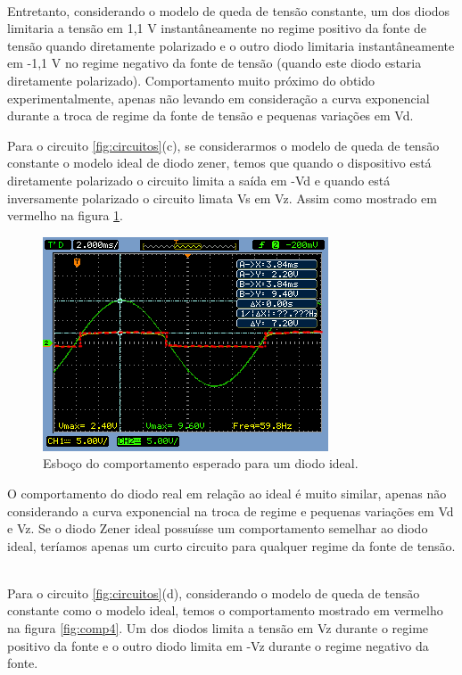 \documentclass{abntex2}
\begin{document}
\\Entretanto, considerando o modelo de queda de tensão constante, um dos diodos limitaria a tensão em 1,1 V instantâneamente no regime positivo da fonte de tensão quando diretamente polarizado e o outro diodo limitaria instantâneamente em -1,1 V no regime negativo da
fonte de tensão (quando este diodo estaria diretamente polarizado). Comportamento muito próximo do obtido experimentalmente, apenas não levando em consideração a curva exponencial durante a troca de regime da fonte de tensão e pequenas variações em Vd.


Para o circuito \ref{fig:circuitos}(c), se considerarmos o modelo de queda de tensão constante o modelo ideal de diodo zener, temos que quando o dispositivo está diretamente polarizado o circuito limita a saída em -Vd e quando está inversamente polarizado o circuito limata Vs em Vz. Assim como mostrado em vermelho na figura \ref{fig:comp3}.

\begin{figure}[h]
  \centering
  \includegraphics[scale = .7]{circuito-1c-esboco.png}
  \caption{Esboço do comportamento esperado para um diodo ideal.}
  \label{fig:comp3}
\end{figure}
\pagebreak
O comportamento do diodo real em relação ao ideal é muito similar, apenas não considerando a curva exponencial na troca de regime e pequenas variações em Vd e Vz.
Se o diodo Zener ideal possuísse um comportamento semelhar ao diodo ideal, teríamos apenas um curto circuito para qualquer regime da fonte de tensão.

\\Para o circuito \ref{fig:circuitos}(d), considerando o modelo de queda de tensão constante como o modelo ideal, temos o comportamento mostrado em vermelho na figura \ref{fig:comp4}.
Um dos diodos limita a tensão em Vz durante o regime positivo da fonte e o outro diodo limita em -Vz durante o regime negativo da fonte.
\end{document}
